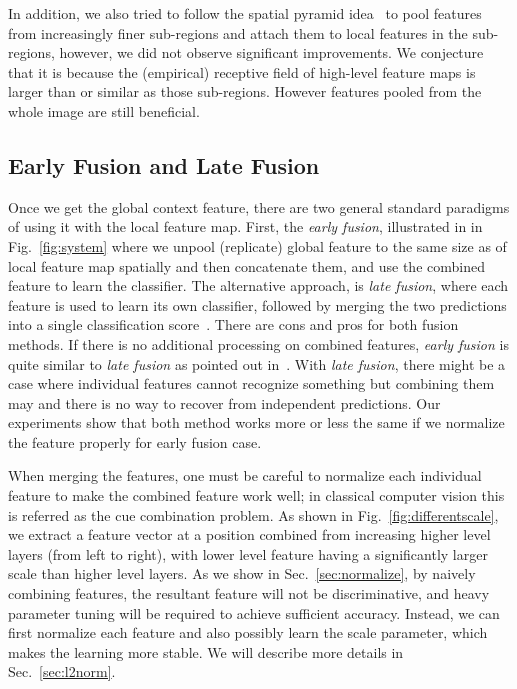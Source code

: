 \documentclass{article} \usepackage{iclr2016_conference}
\begin{document}
In addition, we also tried to follow the spatial pyramid idea~\cite{lazebnik2006beyond} to pool features from increasingly finer sub-regions and attach them to local features in the sub-regions, however, we did not observe significant improvements. We conjecture that it is because the (empirical) receptive field of high-level feature maps is larger than or similar as those sub-regions. However features pooled from the whole image are still beneficial.

\subsection{Early Fusion and Late Fusion}
\label{sec:earlylatefusion}
Once we get the global context feature, there are two general standard paradigms of using it with the local feature map. First, the \emph{early fusion}, illustrated in in Fig.~\ref{fig:system} where we unpool (replicate) global feature to the same size as of local feature map spatially and then concatenate them, and use the combined feature to learn the classifier. The alternative approach, is \emph{late fusion}, where each feature is used to learn its own classifier, followed by merging the two predictions into a single classification score~\cite{long2014fully, chen2014semantic}. There are cons and pros for both fusion methods. If there is no additional processing on combined features, \emph{early fusion} is quite similar to \emph{late fusion} as pointed out in~\cite{hariharan2014hypercolumns}. With \emph{late fusion}, there might be a case where individual features cannot recognize something but combining them may and there is no way to recover from independent predictions. Our experiments show that both method works more or less the same if we normalize the feature properly for early fusion case.

When merging the features, one must be careful to normalize each individual feature to make the combined feature work well; in classical computer vision this is referred as the cue combination problem. As shown in Fig.~\ref{fig:differentscale}, we extract a feature vector at a position combined from increasing higher level layers (from left to right), with lower level feature having a significantly larger scale than higher level layers. As we show in Sec.~\ref{sec:normalize}, by naively combining features, the resultant feature will not be discriminative, and heavy parameter tuning will be required to achieve sufficient accuracy. Instead, we can first  normalize each feature and also possibly learn the scale parameter, which makes the learning more stable. We will describe more details in Sec.~\ref{sec:l2norm}.
\end{document}
